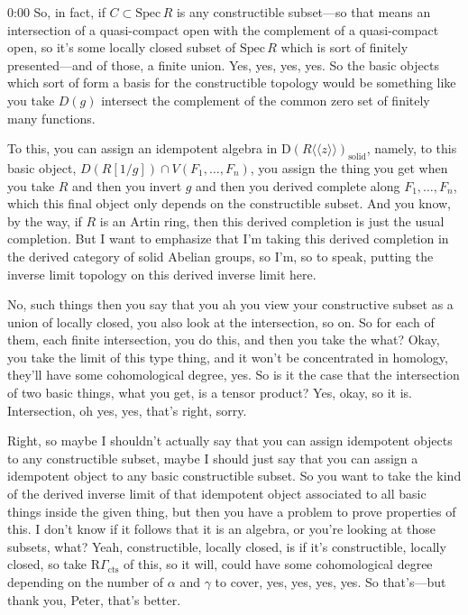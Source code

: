 \begin{unfinished}{0:00}
So, in fact, if $C \subset \mathrm{Spec}\, R$ is any constructible subset---so that means an intersection of a quasi-compact open with the complement of a quasi-compact open, so it's some locally closed subset of $\mathrm{Spec}\, R$ which is sort of finitely presented---and of those, a finite union. Yes, yes, yes, yes. So the basic objects which sort of form a basis for the constructible topology would be something like you take $D(g)$ intersect the complement of the common zero set of finitely many functions. 

To this, you can assign an idempotent algebra in $\mathrm{D}(R\langle\langle z\rangle\rangle)_\mathrm{solid}$, namely, to this basic object, $D(R[1/g]) \cap V(F_1,\dots,F_n)$, you assign the thing you get when you take $R$ and then you invert $g$ and then you derived complete along $F_1,\dots,F_n$, which this final object only depends on the constructible subset. And you know, by the way, if $R$ is an Artin ring, then this derived completion is just the usual completion. But I want to emphasize that I'm taking this derived completion in the derived category of solid Abelian groups, so I'm, so to speak, putting the inverse limit topology on this derived inverse limit here.

No, such things then you say that you ah you view your constructive subset as a union of locally closed, you also look at the intersection, so on. So for each of them, each finite intersection, you do this, and then you take the what? Okay, you take the limit of this type thing, and it won't be concentrated in homology, they'll have some cohomological degree, yes. So is it the case that the intersection of two basic things, what you get, is a tensor product? Yes, okay, so it is. Intersection, oh yes, yes, that's right, sorry.

Right, so maybe I shouldn't actually say that you can assign idempotent objects to any constructible subset, maybe I should just say that you can assign a idempotent object to any basic constructible subset. So you want to take the kind of the derived inverse limit of that idempotent object associated to all basic things inside the given thing, but then you have a problem to prove properties of this. I don't know if it follows that it is an algebra, or you're looking at those subsets, what? Yeah, constructible, locally closed, is if it's constructible, locally closed, so take $\mathrm{R}\Gamma_\mathrm{cts}$ of this, so it will, could have some cohomological degree depending on the number of $\alpha$ and $\gamma$ to cover, yes, yes, yes, yes. So that's---but thank you, Peter, that's better. 


\end{unfinished}
